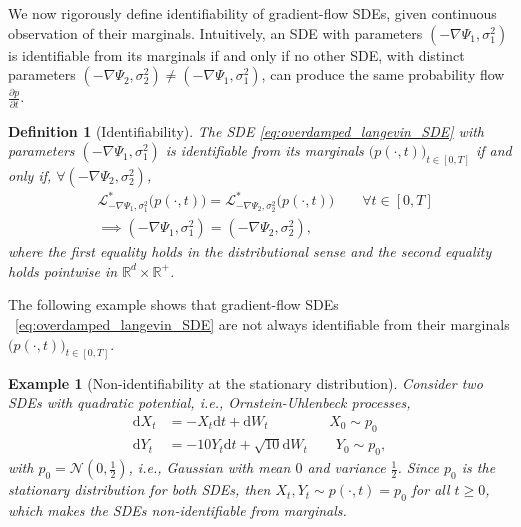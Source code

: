 \documentclass[twoside]{article}
\newcommand{\R} {\mathbb R}
\newcommand{\dXt}{\mathrm{d}X_t}
\newcommand{\dYt}{\mathrm{d}Y_t}
\newcommand{\dt}{\mathrm{d}t}
\newcommand{\dWt}{\mathrm{d}W_t}
\newtheorem{ex}[theorem]{Example}
\newtheorem{defn}[theorem]{Definition}
\begin{document}
We now rigorously define identifiability of gradient-flow SDEs, given continuous observation of their marginals. Intuitively, an SDE with parameters $(-\nabla \Psi_1, \sigma_1^2)$ is identifiable from its marginals if and only if no other SDE, with distinct parameters $(-\nabla \Psi_2, \sigma_2^2)\neq(-\nabla \Psi_1, \sigma_1^2)$, can produce the same probability flow $\frac{\partial p}{\partial t}$.
\begin{defn}[Identifiability]\label{def:non_iden}
The SDE \eqref{eq:overdamped_langevin_SDE}
with parameters $(-\nabla \Psi_1, \sigma_1^2)$ is identifiable from its marginals $\bigl(p(\cdot, t)\bigr)_{t \in [0,T]}$ if and only if, $\forall (-\nabla \Psi_2, \sigma_2^2)$,
\begin{align*}
&\mathcal{L}^*_{-\nabla \Psi_1, \sigma_1^2}\bigl(p(\cdot, t)\bigr) = \mathcal{L}^*_{-\nabla \Psi_2, \sigma_2^2}\bigl(p(\cdot, t)\bigr) \qquad \forall t \in [0,T]\\ &\implies (-\nabla \Psi_1, \sigma_1^2) = (-\nabla \Psi_2, \sigma_2^2),
\label{eq:non_iden_FP}
\end{align*}
where the first equality holds in the distributional sense and the second equality holds pointwise in $\R^d \times \R^+$.
\end{defn}
The following example \citep{lavenant2021towards, guan2024identifying} shows that gradient-flow SDEs ~\eqref{eq:overdamped_langevin_SDE} are not always identifiable from their marginals $\bigl(p(\cdot, t)\bigr)_{t \in [0,T]}$.
\begin{ex}[Non-identifiability at the stationary  distribution]
\label{ex:non_iden_stationary}
    Consider two SDEs with quadratic potential, i.e., Ornstein-Uhlenbeck processes,
\begin{align}
    \dXt{} &= -X_t \dt{} + \dWt{} \qquad\qquad\,\, X_0\sim p_0\\
    \dYt{} &= -10Y_t \dt{} + \sqrt{10}\dWt{} \qquad Y_0\sim p_0,
    \label{eq: non_iden_OU_1D}
\end{align}
with $p_0=\mathcal{N}(0, \frac{1}{2})$, i.e., Gaussian with mean $0$ and variance $\frac{1}{2}$. Since $p_0$ is the stationary distribution for both SDEs, then $X_t, Y_t \sim p(\cdot, t)=p_0$ for all $t \ge 0$, which makes the SDEs  non-identifiable from marginals.
\end{ex}
\end{document}
